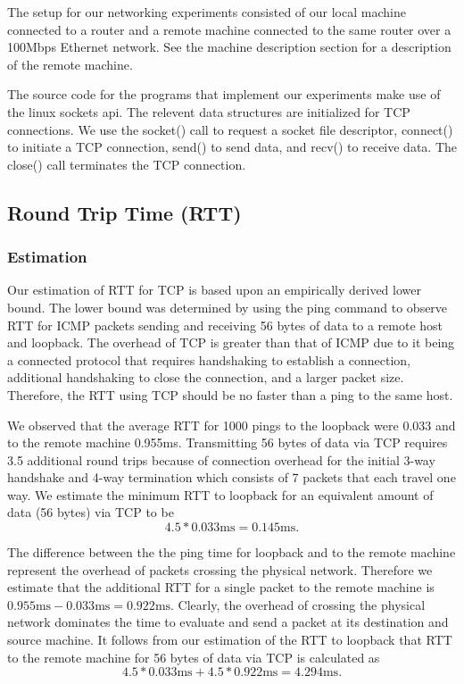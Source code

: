 The setup for our networking experiments consisted of our local machine
connected to a router and a remote machine connected to the same router over a
100Mbps Ethernet network. See the machine description section for a description
of the remote machine.

The source code for the programs that implement our experiments make use of the
linux sockets api. The relevent data structures are initialized for TCP connections.
We use the socket() call to request a socket file descriptor,
connect() to initiate a TCP connection, send() to send data, and recv() to receive
 data. The close() call terminates the TCP connection.

\subsection{Round Trip Time (RTT)}

\subsubsection{Estimation}

Our estimation of RTT for TCP is based upon an empirically derived lower bound.
The lower bound was determined by using the ping command to observe RTT for
ICMP packets sending and receiving 56 bytes of data to a remote host and
loopback. The overhead of TCP is greater than that of ICMP due to it being a
connected protocol that requires handshaking to establish a connection,
additional handshaking to close the connection, and a larger packet size.
Therefore, the RTT using TCP should be no faster than a ping to the same host. 

We observed that the average RTT for 1000 pings to the loopback were 0.033 and
to the remote machine 0.955ms. Transmitting 56 bytes of data via TCP requires
3.5 additional round trips because of connection overhead for the initial 3-way
handshake and 4-way termination which consists of 7 packets that each travel
one way.  We estimate the minimum RTT to loopback for an equivalent amount of
data (56 bytes) via TCP to be $$4.5 * 0.033\text{ms} = 0.145\text{ms}.$$  

The difference between the the ping time for loopback and to the remote machine
represent the overhead of packets crossing the physical network. Therefore we
estimate that the additional RTT for a single packet to the remote machine is
$0.955\text{ms} - 0.033\text{ms} = 0.922\text{ms}$. Clearly, the overhead of
crossing the physical network dominates the time to evaluate and send a packet
at its destination and source machine. It follows from our estimation of the
RTT to loopback that RTT to the remote machine for 56 bytes of data via TCP is
calculated as $$4.5 * 0.033\text{ms} + 4.5 * 0.922\text{ms} = 4.294\text{ms}.$$

